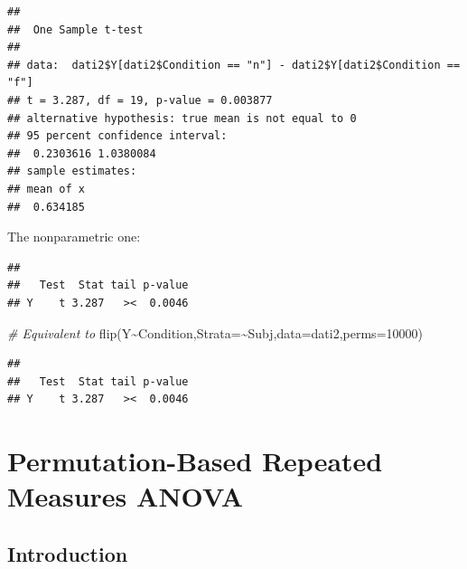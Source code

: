 \documentclass[
]{article}
\newenvironment{Shaded}{\begin{snugshade}}{\end{snugshade}}
\newcommand{\AttributeTok}[1]{\textcolor[rgb]{0.77,0.63,0.00}{#1}}
\newcommand{\CommentTok}[1]{\textcolor[rgb]{0.56,0.35,0.01}{\textit{#1}}}
\newcommand{\DecValTok}[1]{\textcolor[rgb]{0.00,0.00,0.81}{#1}}
\newcommand{\FunctionTok}[1]{\textcolor[rgb]{0.00,0.00,0.00}{#1}}
\newcommand{\NormalTok}[1]{#1}
\newcommand{\SpecialCharTok}[1]{\textcolor[rgb]{0.00,0.00,0.00}{#1}}
\newcommand{\StringTok}[1]{\textcolor[rgb]{0.31,0.60,0.02}{#1}}
\begin{document}
\begin{verbatim}
## 
##  One Sample t-test
## 
## data:  dati2$Y[dati2$Condition == "n"] - dati2$Y[dati2$Condition == "f"]
## t = 3.287, df = 19, p-value = 0.003877
## alternative hypothesis: true mean is not equal to 0
## 95 percent confidence interval:
##  0.2303616 1.0380084
## sample estimates:
## mean of x 
##  0.634185
\end{verbatim}

The nonparametric one:

\begin{Shaded}
\end{Shaded}

\begin{verbatim}
## 
##   Test  Stat tail p-value
## Y    t 3.287   ><  0.0046
\end{verbatim}

\begin{Shaded}
\begin{Highlighting}[]
\CommentTok{\# Equivalent to}
\FunctionTok{flip}\NormalTok{(Y}\SpecialCharTok{\textasciitilde{}}\NormalTok{Condition,}\AttributeTok{Strata=}\SpecialCharTok{\textasciitilde{}}\NormalTok{Subj,}\AttributeTok{data=}\NormalTok{dati2,}\AttributeTok{perms=}\DecValTok{10000}\NormalTok{)}
\end{Highlighting}
\end{Shaded}

\begin{verbatim}
## 
##   Test  Stat tail p-value
## Y    t 3.287   ><  0.0046
\end{verbatim}

\hypertarget{permutation-based-repeated-measures-anova}{%
\section{Permutation-Based Repeated Measures
ANOVA}\label{permutation-based-repeated-measures-anova}}

\hypertarget{introduction-1}{%
\subsection{Introduction}\label{introduction-1}}
\end{document}
